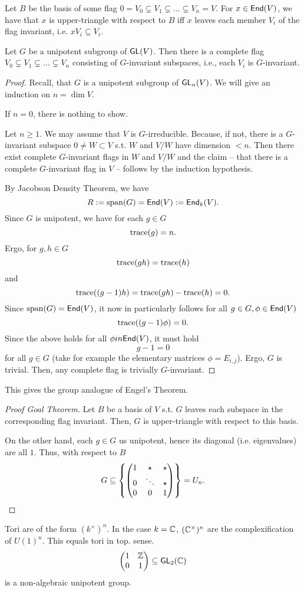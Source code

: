 Let $B$ be the basis of some flag $0 = V_0 \subsetneq V_1 \subsetneq \ldots \subsetneq V_n = V$.
For $x \in \textsf{End}(V)$, we have that $x$ is upper-triangle with respect to $B$ iff $x$ leaves each member $V_i$ of the flag invariant, i.e. $xV_i \subseteq V_i.$

\begin{proposition}
	Let $G$ be a unipotent subgroup of $\textsf{GL}(V)$. Then there is a complete flag $ V_0 \subsetneq V_1 \subsetneq \ldots \subsetneq V_n$ consisting of $G$-invariant subspaces, i.e., each $V_i$ is $G$-invariant.
\end{proposition}
\begin{proof}
Recall, that $G$ is a unipotent subgroup of $\textsf{GL}_n(V)$. We will give an induction on $n = \dim V$.

If $n = 0$, there is nothing to show.

Let $n \geq 1$. We may assume that $V$ is $G$-irreducible. Because, if not, there is a $G$-invariant subspace $0\neq W \subset V$ s.t. $W$ and $V/W$ have dimension $< n$. Then there exist complete $G$-invariant flags in $W$ and $V/W$ and the claim -- that there is a complete $G$-invariant flag in $V$ -- follows by the induction hypothesis.

By Jacobson Density Theorem, we have
\[ R := \mathrm{span}(G) = \textsf{End}(V) := \textsf{End}_k(V). \]
Since $G$ is unipotent, we have for each $g \in G$
\[ \mathrm{trace}(g) = n.\]
Ergo, for $g,h \in G$
\[ \mathrm{trace}(gh) = \mathrm{trace}(h) \]
and
\[ \mathrm{trace}((g-1)h) = \mathrm{trace}(gh) - \mathrm{trace}(h) = 0. \]
Since $\mathrm{span}(G) = \textsf{End}(V)$, it now in particularly follows for all $g \in G, \phi \in \textsf{End}(V)$
\[ \mathrm{trace}((g-1) \phi) = 0. \]
Since the above holds for all $\phi in \textsf{End}(V)$, it must hold
\[ g-1 = 0 \]
for all $g \in G$ (take for example the elementary matrices $\phi = E_{i,j}$). Ergo, $G$ is trivial. Then, any complete flag is trivially $G$-invariant.
\end{proof}
\begin{remark}
	This gives the group analogue of Engel's Theorem.
\end{remark}
\begin{proof}[Proof Goal Theorem]
	Let $B$ be a basis of $V$ s.t. $G$ leaves each subspace in the corresponding flag invariant. Then, $G$ is upper-triangle with respect to this basis.
	
	On the other hand, each $g \in G$ us unipotent, hence its diagonal (i.e. eigenvalues) are all $1$. Thus, with respect to $B$
	\[ G \subseteq \left\lbrace
	\left(\begin{matrix} 1 & \star & \star\\ 0 & \ddots & \star \\ 0 & 0 & 1 \end{matrix}\right)\right\rbrace = U_n.\]
\end{proof}
\begin{remark}
	Tori are of the form $(k^\times)^n$. In the case $k = \mathbb{C}$, $(\mathbb{C}^\times)^n$ are the complexification of $U(1)^n$. This equals tori in top. sense.
	\[
	\left(\begin{matrix} 1 & \mathbb{Z} \\ 0 & 1 \end{matrix}\right) \subseteq \textsf{GL}_2(\mathbb{C})
	 \]
	 is a non-algebraic unipotent group.
\end{remark}

